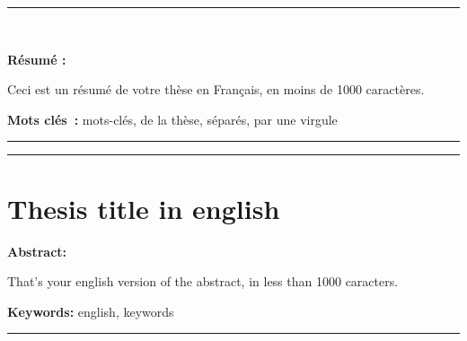 \documentclass[french, a4paper, 11pt, twoside, pdftex]{StyleThese}
\begin{document}


\begingroup\raggedright        	%
\endgroup


\cleardoublepage


\begin{vcenterpage}
\noindent\rule[2pt]{\textwidth}{0.5pt}
\\ %
	{\large\textbf{Résumé :} 

		Ceci est un résumé de votre thèse en Français, en moins de 1000 caractères.
	}
\smallbreak
{\large\textbf{Mots clés~:} mots-clés, de la thèse, séparés, par une virgule}
\\
\noindent\rule[2pt]{\textwidth}{0.5pt}
\end{vcenterpage}
\begin{vcenterpage}
\noindent\rule[2pt]{\textwidth}{0.5pt}
\section*{Thesis title in english}
	{\large\textbf{Abstract:}

		That's your english version of the abstract, in less than 1000 caracters.
	}
	\smallbreak
	{\large\textbf{Keywords:} english, keywords}
\\ %
\noindent\rule[2pt]{\textwidth}{0.5pt}
\end{vcenterpage}

\restoregeometry
\end{document}
